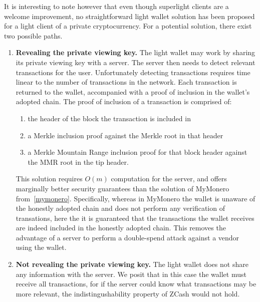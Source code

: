 It is interesting to note however that even though superlight clients are a welcome improvement, no straightforward light wallet solution has been proposed for a light client of a private cryptocurrency. For a potential solution, there exist two possible paths.

\begin{enumerate}
    \item \textbf{Revealing the private viewing key.} The light wallet may work by sharing its private viewing key with a server. The server then needs to detect relevant transactions for the user. Unfortunately detecting transactions requires time linear to the number of transactions in the network. Each transaction is returned to the wallet, accompanied with a proof of inclusion in the wallet's adopted chain. The proof of inclusion of a transaction is comprised of:
    \begin{enumerate}
        \item the header of the block the transaction is included in
        \item a Merkle inclusion proof against the Merkle root in that header
        \item a Merkle Mountain Range inclusion proof for that block header against the MMR root in the tip header.
    \end{enumerate}
    This solution requires $O(m)$ computation for the server, and offers marginally better security guarantees than the solution of MyMonero from~\cref{mymonero}. Specifically, whereas in MyMonero the wallet is unaware of the honestly adopted chain and does not perform any verification of transations, here the it is guaranteed that the transactions the wallet receives are indeed included in the honestly adopted chain. This removes the advantage of a server to perform a double-spend attack against a vendor using the wallet.
    \item \textbf{Not revealing the private viewing key.} The light wallet does not share any information with the server. We posit that in this case the wallet must receive all transactions, for if the server could know what transactions may be more relevant, the indistingushability property of ZCash would not hold.
\end{enumerate}
